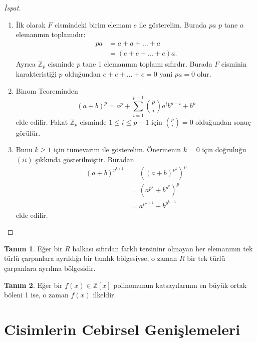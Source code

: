 \documentclass{article}
\theoremstyle{definition}
\newtheorem{defn}{Tanım}[section]
\theoremstyle{remark}
\begin{document}
		    \begin{proof}[İspat]
		        \begin{enumerate}	\renewcommand{\labelenumi}{(\roman{enumi})}
				    \item İlk olarak $F$ cismindeki birim elemanı $e$ ile gösterelim. Burada $pa$ $p$ tane $a$ elemanının toplamıdır:
				    \begin{align*}
				        pa &= a + a + \dots + a\\
				        &= (e + e + \dots + e)a.
				    \end{align*}
				    Ayrıca $\mathbb{Z}_p$ cisminde $p$ tane 1 elemanının toplamı sıfırdır. Burada $F$ cisminin karakteristiği $p$ olduğundan $e + e + \dots + e = 0$ yani $pa = 0$ olur.
				    \item Binom Teoreminden
				    \begin{equation*}
				        (a + b)^p = a^p + \sum_{i = 1}^{p - 1}{\binom{p}{i} a^i b^{p - i}} + b^p
				    \end{equation*}
				    elde edilir. Fakat $\mathbb{Z}_p$ cisminde $1 \leq i \leq p - 1$ için $\binom{p}{i} = 0$ olduğundan sonuç görülür.
				    \item Bunu $k \geq 1$ için tümevarım ile gösterelim. Önermenin $k = 0$ için doğruluğu $(ii)$ şıkkında gösterilmiştir. Buradan
				    \begin{align*}
				        (a + b)^{p^{k + 1}} &= ((a + b)^{p^k})^p\\
				        &= (a^{p^k} + b^{p^k})^p\\
				        &= a^{p^{k + 1}} + b^{p^{k + 1}}
				    \end{align*}
				    elde edilir.
			    \end{enumerate}
		    \end{proof}
    		
    		\begin{defn}
    		    Eğer bir $R$ halkası sıfırdan farklı tersininr olmayan her elemanının tek türlü çarpanlara ayrıldığı bir tamlık bölgesiyse, o zaman $R$ bir tek türlü çarpanlara ayrılma bölgesidir.
    		\end{defn}
    		
    		\begin{defn}
    		    Eğer bir $f(x) \in \mathbb{Z}[x]$ polinomunun katsayılarının en büyük ortak böleni 1 ise, o zaman $f(x)$ ilkeldir.
    		\end{defn}
		    
	\section{Cisimlerin Cebirsel Genişlemeleri}
	
\end{document}
